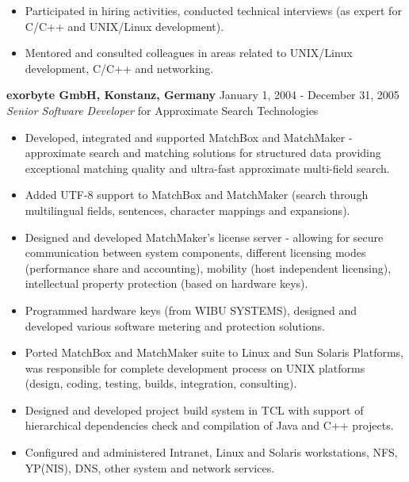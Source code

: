 \documentclass[a4paper,12pt,]{article}
\begin{document}
\begin{description}
\begin{itemize}
    \item Participated in hiring activities, conducted technical interviews 
        (as expert for C/C++ and UNIX/Linux development).

    \item Mentored and consulted colleagues in areas related to UNIX/Linux development, C/C++ and networking. 

    \end{itemize}

  \item{\bfseries exorbyte GmbH, Konstanz, Germany} \hfill January 1, 2004 - December 31, 2005 \\ 
    {\em Senior Software Developer} for Approximate Search Technologies
    
    \begin{itemize}
      
    \item Developed, integrated and supported MatchBox and MatchMaker
      - {approximate} search and matching solutions for structured data providing
      exceptional matching quality and ultra-fast approximate multi-field search.
    
    \item Added UTF-8 support to MatchBox and MatchMaker (search through multilingual fields,
      sentences, character mappings and expansions).

    \item Designed and developed MatchMaker's license server - allowing for secure communication
      between system components, different licensing modes (performance share and accounting),
      mobility (host independent licensing), intellectual property protection (based on hardware keys).

    \item Programmed hardware keys (from WIBU SYSTEMS), designed and developed various software metering
      and protection solutions.

    \item Ported MatchBox and MatchMaker suite to Linux and Sun Solaris Platforms, was responsible 
      for complete development process on UNIX platforms (design, coding, testing, builds, integration,
      consulting).

    \item Designed and developed project build system in TCL with support of hierarchical
      dependencies check and compilation of Java and C++ projects. 

    \item Configured and administered Intranet, Linux and Solaris workstations, NFS, YP(NIS), 
      DNS, other system and network services.


\end{itemize}
\end{description}
\end{document}

